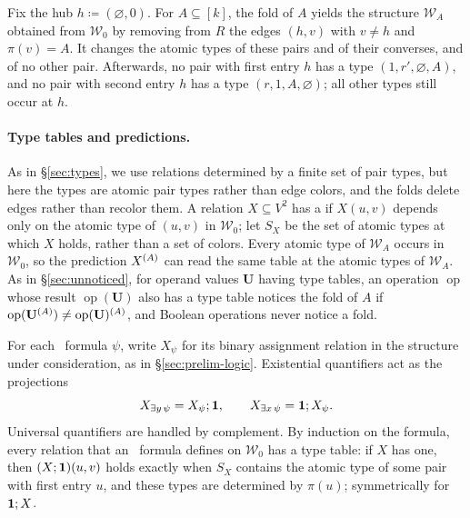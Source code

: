 Fix the hub $h\coloneqq(\varnothing,0)$. For $A\subseteq[k]$, the fold
of $A$ yields the structure $\mathcal W_A$ obtained from $\mathcal W_0$ by
removing from $R$ the edges $(h,v)$ with $v\ne h$ and $\pi(v)=A$. It
changes the atomic types of these pairs and of their converses, and of no
other pair. Afterwards, no pair with first entry $h$ has a type
$(1,r',\varnothing,A)$, and no pair with second entry $h$ has a type
$(r,1,A,\varnothing)$; all other types still occur at $h$.

\paragraph{Type tables and predictions.}
As in \S\ref{sec:types}, we use relations determined by a finite
set of pair types, but here the types are atomic pair types rather
than edge colors, and the folds delete edges rather than recolor them.
A relation $X\subseteq V^2$ has a  if $X(u,v)$ depends
only on the atomic type of $(u,v)$ in $\mathcal W_0$; let $S_X$ be the
set of atomic types at which $X$ holds, rather than a set of colors.
Every atomic type of $\mathcal W_A$ occurs in $\mathcal W_0$, so the prediction $X^{(A)}$ can
read the same table at the atomic types of $\mathcal W_A$. As in
\S\ref{sec:unnoticed}, for operand values $\mathbf U$ having type tables,
an operation $\operatorname{op}$ whose result $\operatorname{op}(\mathbf U)$
also has a type table notices the fold of $A$ if
$\operatorname{op}(\mathbf U^{(A)})\ne\operatorname{op}(\mathbf U)^{(A)}$,
and Boolean operations never notice a fold.

For each \FOtwo\ formula $\psi$, write $X_\psi$ for its binary
assignment relation in the structure under consideration, as in
\S\ref{sec:prelim-logic}. Existential quantifiers act as the projections
\[
 X_{\exists y\,\psi}=X_\psi;\mathbf{1},\qquad
 X_{\exists x\,\psi}=\mathbf{1};X_\psi.
\]
Universal quantifiers are handled by complement.
By induction on the formula, every relation that an \FOtwo\ formula
defines on $\mathcal W_0$ has a type table: if $X$ has one, then
$(X;\mathbf{1})(u,v)$ holds exactly when $S_X$ contains the atomic type of some
pair with first entry $u$, and these types are determined by $\pi(u)$;
symmetrically for $\mathbf{1};X$.

